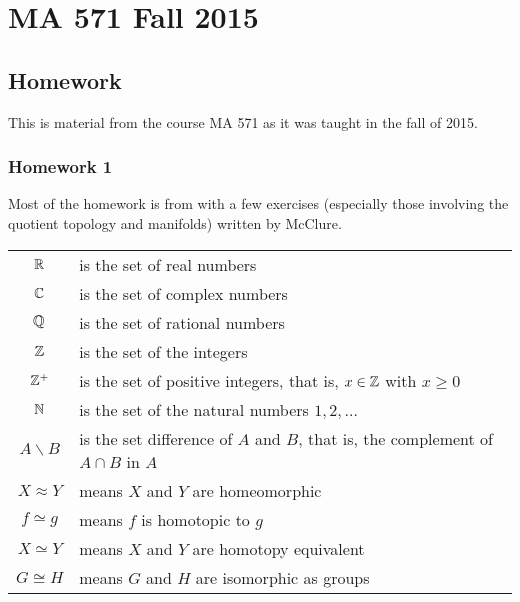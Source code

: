 \chapter{MA 571 Fall 2015}
\thispagestyle{empty}
\bigskip
\section{Homework}
This is material from the course MA 571 as it was taught in the fall of
2015.
\subsection{Homework 1}
Most of the homework is from \cite{munkres} with a few exercises
(especially those involving the quotient topology and manifolds) written by
McClure.

\begin{tabular}{cl}
  $\mathbb{R}$ & is the set of real numbers\\
  $\mathbb{C}$ & is the set of complex numbers\\
  $\mathbb{Q}$ & is the set of rational numbers\\
  $\mathbb{Z}$ & is the set of the integers\\
  $\mathbb{Z}^+$ & is the set of positive integers, that is, $x\in\mathbb{Z}$ with
             $x\geq 0$\\
  $\mathbb{N}$ & is the set of the natural numbers $1,2,\dotsc$\\
  $A\smallsetminus B$ & is the set difference of $A$ and $B$, that is, the
                        complement of $A\cap B$ in $A$\\
  $X\approx Y$& means $X$ and $Y$ are homeomorphic\\
  $f\simeq g$& means $f$ is homotopic to $g$\\
  $X\simeq Y$&means $X$ and $Y$ are homotopy equivalent\\
  $G\cong H$& means $G$ and $H$ are isomorphic as groups
\end{tabular}

\newpage



